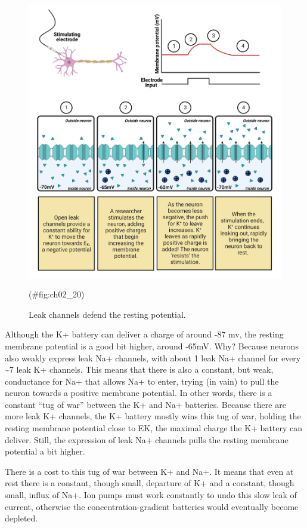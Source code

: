 \documentclass[
]{book}
\begin{document}
\begin{figure}

{\centering \includegraphics[width=0.8\linewidth]{images/ch02/02_20} 

}

\caption{Leak channels defend the resting potential.}(\#fig:ch02_20)
\end{figure}

Although the K+ battery can deliver a charge of around -87 mv, the resting membrane potential is a good bit higher, around -65mV. Why? Because neurons also weakly express leak Na+ channels, with about 1 leak Na+ channel for every \textasciitilde7 leak K+ channels. This means that there is also a constant, but weak, conductance for Na+ that allows Na+ to enter, trying (in vain) to pull the neuron towards a positive membrane potential. In other words, there is a constant ``tug of war'' between the K+ and Na+ batteries. Because there are more leak K+ channels, the K+ battery mostly wins this tug of war, holding the resting membrane potential close to EK, the maximal charge the K+ battery can deliver. Still, the expression of leak Na+ channels pulls the resting membrane potential a bit higher.

There is a cost to this tug of war between K+ and Na+. It means that even at rest there is a constant, though small, departure of K+ and a constant, though small, influx of Na+. Ion pumps must work constantly to undo this slow leak of current, otherwise the concentration-gradient batteries would eventually become depleted.
\end{document}
